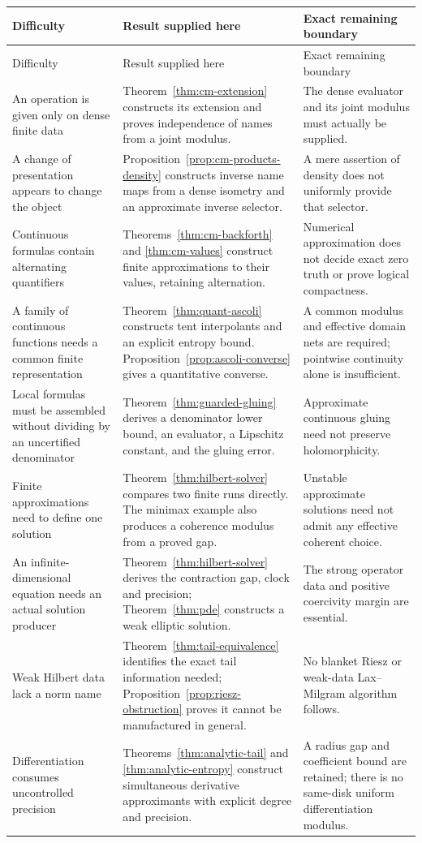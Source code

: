 \begin{longtable}{p{}p{}p{}}
\toprule
Difficulty & Result supplied here & Exact remaining boundary\\
\midrule
\endfirsthead
\toprule
Difficulty & Result supplied here & Exact remaining boundary\\
\midrule
\endhead
An operation is given only on dense finite data &
Theorem~\ref{thm:cm-extension} constructs its extension and proves independence
of names from a joint modulus. &
The dense evaluator and its joint modulus must actually be supplied.\\[2mm]
A change of presentation appears to change the object &
Proposition~\ref{prop:cm-products-density} constructs inverse name maps from
a dense isometry and an approximate inverse selector. &
A mere assertion of density does not uniformly provide that selector.\\[2mm]
Continuous formulas contain alternating quantifiers &
Theorems~\ref{thm:cm-backforth} and \ref{thm:cm-values} construct finite
approximations to their values, retaining alternation. &
Numerical approximation does not decide exact zero truth or prove
logical compactness.\\[2mm]
A family of continuous functions needs a common finite representation &
Theorem~\ref{thm:quant-ascoli} constructs tent interpolants and an explicit
entropy bound. Proposition~\ref{prop:ascoli-converse} gives a quantitative
converse. &
A common modulus and effective domain nets are required; pointwise
continuity alone is insufficient.\\[2mm]
Local formulas must be assembled without dividing by an uncertified
denominator &
Theorem~\ref{thm:guarded-gluing} derives a denominator lower bound, an
evaluator, a Lipschitz constant, and the gluing error. &
Approximate continuous gluing need not preserve holomorphicity.\\[2mm]
Finite approximations need to define one solution &
Theorem~\ref{thm:hilbert-solver} compares two finite runs directly.
The minimax example also produces a coherence modulus from a proved gap. &
Unstable approximate solutions need not admit any effective coherent choice.\\[2mm]
An infinite-dimensional equation needs an actual solution producer &
Theorem~\ref{thm:hilbert-solver} derives the contraction gap, clock and
precision; Theorem~\ref{thm:pde} constructs a weak elliptic solution. &
The strong operator data and positive coercivity margin are essential.\\[2mm]
Weak Hilbert data lack a norm name &
Theorem~\ref{thm:tail-equivalence} identifies the exact tail information
needed; Proposition~\ref{prop:riesz-obstruction} proves it cannot be
manufactured in general. &
No blanket Riesz or weak-data Lax--Milgram algorithm follows.\\[2mm]
Differentiation consumes uncontrolled precision &
Theorems~\ref{thm:analytic-tail} and \ref{thm:analytic-entropy} construct
simultaneous derivative approximants with explicit degree and precision. &
A radius gap and coefficient bound are retained; there is no same-disk
uniform differentiation modulus.\\
\bottomrule
\end{longtable}

